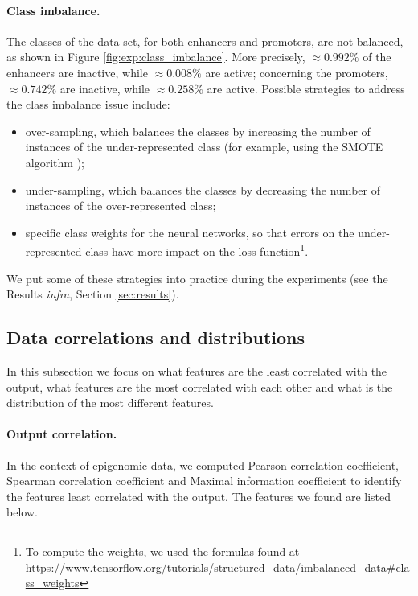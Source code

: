 \documentclass{article}
\begin{document}
\paragraph{Class imbalance.} The classes of the data set, for both enhancers and promoters, are not balanced, as shown in Figure \ref{fig:exp:class_imbalance}. More precisely, $\approx 0.992\%$ of the enhancers are inactive, while $\approx 0.008\%$ are active; concerning the promoters, $\approx 0.742\%$ are inactive, while $\approx 0.258\%$ are active. Possible strategies to address the class imbalance issue include:
\begin{itemize}
    \item over-sampling, which balances the classes by increasing the number of instances of the under-represented class (for example, using the SMOTE algorithm \cite{chawla02smote});
    \item under-sampling, which balances the classes by decreasing the number of instances of the over-represented class;
    \item specific class weights for the neural networks, so that errors on the under-represented class have more impact on the loss function\footnote{To compute the weights, we used the formulas found at \url{https://www.tensorflow.org/tutorials/structured_data/imbalanced_data\#class_weights}}. 
\end{itemize}

We put some of these strategies into practice during the experiments (see the Results \textit{infra}, Section \ref{sec:results}).

\subsection{Data correlations and distributions}
\label{subsec:exp:correlations}

In this subsection we focus on what features are the least correlated with the output, what features are the most correlated with each other and what is the distribution of the most different features. 

\paragraph{Output correlation.} In the context of epigenomic data, we computed Pearson correlation coefficient, Spearman correlation coefficient and Maximal information coefficient to identify the features least correlated with the output. The features we found are listed below.
\end{document}
